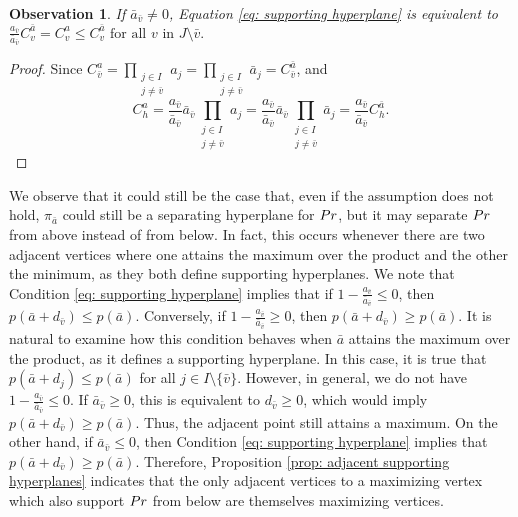 \documentclass{article}
\newtheorem{observation}[theorem]{Observation}
\begin{document}
\begin{observation}
	If \(\bar{a}_{\bar{v}}\neq 0\), Equation \eqref{eq: supporting hyperplane} is equivalent to \(\frac{a_{\bar{v}}}{\bar{a}_{\bar{v}}} C_v^{\bar{a}} = C_v^{a}\leq C_v^{\bar{a}} \text{ for all } v \text{ in } J\setminus{\bar{v}}.\)
\end{observation}
\begin{proof}
Since \( C_{\bar{v}}^a = \prod_{\substack{j \in I \\ j \neq \bar{v}}}a_j = \prod_{\substack{j \in I \\ j \neq \bar{v}}}\bar{a}_j = C_{\bar{v}}^{\bar{a}}\), and 
 \[ C_{h}^a = \frac{a_{\bar{v}}}{\bar{a}_{\bar{v}}}\bar{a}_{\bar{v}}\prod_{\substack{j \in I \\ j \neq \bar{v}}}a_j = \frac{a_{\bar{v}}}{\bar{a}_{\bar{v}}}\bar{a}_{\bar{v}}\prod_{\substack{j \in I \\ j \neq \bar{v}}}\bar{a}_j =  \frac{a_{\bar{v}}}{\bar{a}_{\bar{v}}}C_{h}^{\bar{a}}.\]
\end{proof}

We observe that it could still be the case that, even if the assumption does not hold, \(\pi_{\bar{a}}\) could still be a separating hyperplane for \(Pr\), but it may separate \(Pr\) from above instead of from below. In fact, this occurs whenever there are two adjacent vertices where one attains the maximum over the product and the other the minimum, as they both define supporting hyperplanes.
%
We note that Condition \eqref{eq: supporting hyperplane} implies that if \(1 - \frac{a_{\bar{v}}}{\bar{a}_{\bar{v}}} \leq 0\), then \(p(\bar{a} + d_{\bar{v}}) \leq p(\bar{a})\). Conversely, if \(1 - \frac{a_{\bar{v}}}{\bar{a}_{\bar{v}}} \geq 0\), then \(p(\bar{a} + d_{\bar{v}}) \geq p(\bar{a})\).
%
It is natural to examine how this condition behaves when \(\bar{a}\) attains the maximum over the product, as it defines a supporting hyperplane. In this case, it is true that \(p(\bar{a} + d_j) \leq p(\bar{a})\) for all \(j \in I \setminus \{\bar{v}\}\). However, in general, we do not have \(1 - \frac{a_{\bar{v}}}{\bar{a}_{\bar{v}}} \leq 0\). If \(\bar{a}_{\bar{v}} \geq 0\), this is equivalent to \(d_{\bar{v}} \geq 0\), which would imply \(p(\bar{a} + d_{\bar{v}}) \geq p(\bar{a})\). Thus, the adjacent point still attains a maximum.
%
On the other hand, if \(\bar{a}_{\bar{v}} \leq 0\), then Condition \eqref{eq: supporting hyperplane} implies that \(p(\bar{a} + d_{\bar{v}}) \geq p(\bar{a})\). Therefore, Proposition \ref{prop: adjacent supporting hyperplanes} indicates that the only adjacent vertices to a maximizing vertex which also support \(Pr\) from below are themselves maximizing vertices.
%
\end{document}
